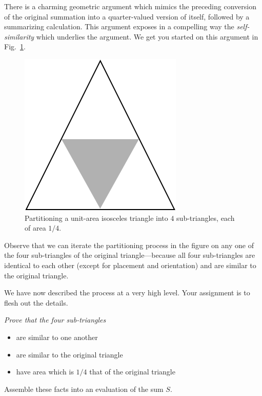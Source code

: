 \begin{enumerate}
\smallskip

There is a charming geometric argument which mimics the preceding conversion of the original summation into a quarter-valued version of itself, followed by a summarizing calculation.  This argument exposes in a compelling way the {\em self-similarity} which underlies the argument.  We get you started on this argument in Fig.~\ref{fig:Sum1over4}.
 \begin{figure}[ht]
\begin{center}
       \includegraphics[scale=0.35]{FiguresMaths/Sum1over4}
\caption{Partitioning a unit-area isosceles triangle into $4$ sub-triangles, each of area $1/4$.}
       \label{fig:Sum1over4}
\end{center}
\end{figure}
Observe that we can iterate the partitioning process in the figure on any one of the four sub-triangles of the original triangle---because all four sub-triangles are identical to each other (except for placement and orientation) and are similar to the original triangle.

\smallskip

We have now described the process at a very high level.  Your assignment is to flesh out the details.  {\em Prove that the four sub-triangles
\begin{itemize}
\item
are similar to one another
\item
are similar to the original triangle
\item
have area which is $1/4$ that of the original triangle
\end{itemize}
Assemble these facts into an evaluation of the sum $S$.}
\end{enumerate}


